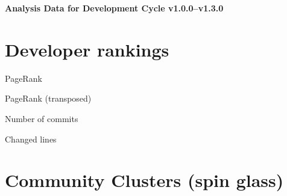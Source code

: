 \documentclass{article}
\begin{document}
\setlength{\parindent}{0pt}
\begin{center}
\begin{Large}
\textbf{Analysis Data for Development Cycle v1.0.0--v1.3.0}
\end{Large}
\end{center}
\section{Developer rankings}
\begin{small}\renewcommand{\tabcolsep}{1pt}
\begin{minipage}{0.5\linewidth}
PageRank\\

\end{minipage}%
\begin{minipage}{0.5\linewidth}
PageRank (transposed)\\

\end{minipage}

\renewcommand{\tabcolsep}{5pt}
\begin{minipage}{0.5\linewidth}
Number of commits\\

\end{minipage}%
\begin{minipage}{0.5\linewidth}
Changed lines\\

\end{minipage}
\end{small}
\newpage\section{Community Clusters (spin glass)}
\end{document}
